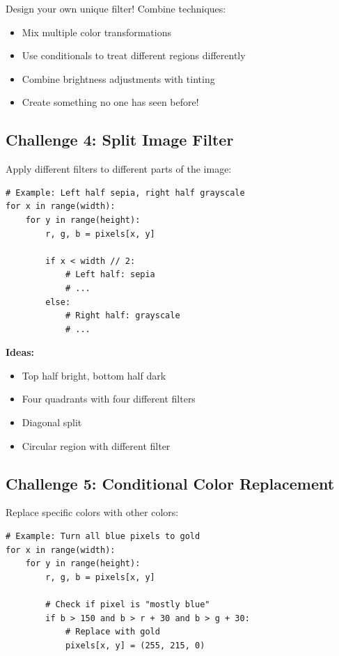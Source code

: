 \documentclass[11pt]{article}
\begin{document}
Design your own unique filter! Combine techniques:
\begin{itemize}
    \item Mix multiple color transformations
    \item Use conditionals to treat different regions differently
    \item Combine brightness adjustments with tinting
    \item Create something no one has seen before!
\end{itemize}

\subsection*{Challenge 4: Split Image Filter}

Apply different filters to different parts of the image:

\begin{lstlisting}
# Example: Left half sepia, right half grayscale
for x in range(width):
    for y in range(height):
        r, g, b = pixels[x, y]

        if x < width // 2:
            # Left half: sepia
            # ...
        else:
            # Right half: grayscale
            # ...
\end{lstlisting}

\textbf{Ideas:}
\begin{itemize}
    \item Top half bright, bottom half dark
    \item Four quadrants with four different filters
    \item Diagonal split
    \item Circular region with different filter
\end{itemize}

\subsection*{Challenge 5: Conditional Color Replacement}

Replace specific colors with other colors:

\begin{lstlisting}
# Example: Turn all blue pixels to gold
for x in range(width):
    for y in range(height):
        r, g, b = pixels[x, y]

        # Check if pixel is "mostly blue"
        if b > 150 and b > r + 30 and b > g + 30:
            # Replace with gold
            pixels[x, y] = (255, 215, 0)
\end{lstlisting}
\end{document}
